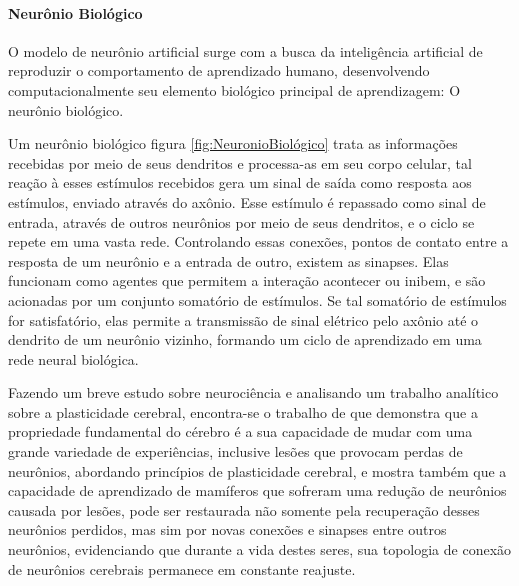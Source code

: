           \paragraph*{Neurônio Biológico}
            O modelo de neurônio artificial surge com a busca da inteligência artificial de reproduzir o comportamento de aprendizado humano, desenvolvendo computacionalmente seu elemento biológico principal de aprendizagem: O neurônio biológico. 
            \begin{figure}[H]
            \end{figure}

Um neurônio biológico figura \ref{fig:NeuronioBiológico} trata as informações recebidas por meio de seus dendritos e processa-as em seu corpo celular, tal reação à esses estímulos recebidos gera um sinal de saída como resposta aos estímulos, enviado através do axônio. Esse estímulo é repassado como sinal de entrada, através de outros neurônios por meio de seus dendritos, e o ciclo se repete em uma vasta rede.
Controlando essas conexões, pontos de contato entre a resposta de um neurônio e a entrada de outro, existem as sinapses. Elas funcionam como agentes que permitem a interação acontecer ou inibem, e são acionadas por um conjunto somatório de estímulos. Se tal somatório de estímulos for satisfatório, elas permite a transmissão de sinal elétrico pelo axônio até o dendrito de um neurônio vizinho, formando um ciclo de aprendizado em uma rede neural biológica.

Fazendo um breve estudo sobre neurociência e analisando um trabalho analítico sobre a plasticidade cerebral, encontra-se o trabalho de \cite{Muhammad2014} que demonstra que a propriedade fundamental do cérebro é a sua capacidade de mudar com uma grande variedade de experiências, inclusive lesões que provocam perdas de neurônios, abordando princípios de plasticidade cerebral, e mostra também que a capacidade de aprendizado de mamíferos que sofreram uma redução de neurônios causada por lesões, pode ser restaurada não somente pela recuperação desses neurônios perdidos, mas sim por novas conexões e sinapses entre outros neurônios, evidenciando que durante a vida destes seres, sua topologia de conexão de neurônios cerebrais permanece em constante reajuste.

